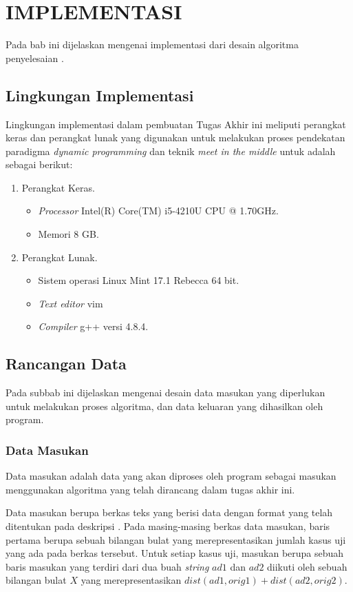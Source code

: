 \chapter{IMPLEMENTASI}

Pada bab ini dijelaskan mengenai implementasi dari desain algoritma penyelesaian \problem{}.

\section{Lingkungan Implementasi}
Lingkungan implementasi dalam pembuatan Tugas Akhir ini
meliputi perangkat keras dan perangkat lunak yang digunakan
untuk melakukan proses pendekatan paradigma \textit{dynamic
programming} dan teknik \textit{meet in the middle} untuk \problem{} adalah sebagai berikut:

\begin{enumerate}
	\item Perangkat Keras.
		\begin{itemize}
			\item \textit{Processor} Intel(R) Core(TM) i5-4210U CPU @ 1.70GHz.
			\item Memori 8 GB.
		\end{itemize}
	\item Perangkat Lunak.
	\begin{itemize}
		\item Sistem operasi Linux Mint 17.1 Rebecca 64 bit.
		\item \textit{Text editor} vim
		\item \textit{Compiler} g++ versi 4.8.4.
	\end{itemize}			
\end{enumerate}


\section{Rancangan Data}
Pada subbab ini dijelaskan mengenai desain data masukan yang
diperlukan untuk melakukan proses algoritma, dan data keluaran
yang dihasilkan oleh program.

\subsection{Data Masukan}
Data masukan adalah data yang akan diproses oleh program sebagai masukan menggunakan algoritma yang telah dirancang dalam tugas akhir ini.

Data masukan berupa berkas teks yang berisi data dengan format yang telah ditentukan pada deskripsi \problem{}. Pada masing-masing berkas data masukan, baris pertama berupa sebuah bilangan bulat yang merepresentasikan jumlah kasus uji yang ada pada berkas tersebut. Untuk setiap kasus uji, masukan berupa sebuah baris masukan yang terdiri dari dua buah \textit{string} $ad1$ dan $ad2$ diikuti oleh sebuah bilangan bulat $ X $ yang merepresentasikan $ dist(ad1, orig1) + dist(ad2, orig2) $.


